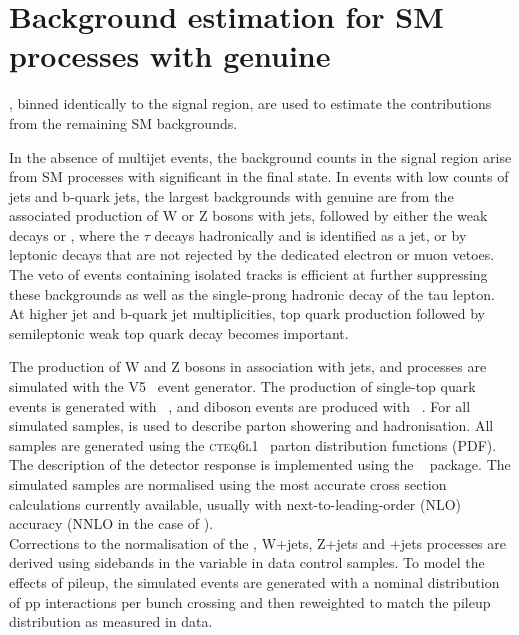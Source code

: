 \section{Background estimation for SM processes with genuine \texorpdfstring{\ETmiss}{MET}}
\label{sec:ewk_background}

, binned identically to the signal region, are used to estimate the
contributions from the remaining SM backgrounds.

In the absence of multijet events, the background counts in the signal
region arise from SM processes with significant \ETmiss in the final
state. In events with low counts of jets and b-quark jets, the largest
backgrounds with genuine \ETmiss are from the associated production of
W or Z bosons with jets, followed by either the weak decays \znunu or
\wtaunu, where the $\tau$ decays hadronically and is identified as a
jet, or by leptonic decays that are not rejected by the dedicated
electron or muon vetoes. The veto of events containing isolated tracks
is efficient at further suppressing these backgrounds as well as the
single-prong hadronic decay of the tau lepton. At higher jet and
b-quark jet multiplicities, top quark production followed by
semileptonic weak top quark decay becomes important.

The production of W and Z bosons in association with jets, \ttbar and
\gj processes are simulated with the \MADGRAPH V5~\cite{madgraph}
event generator. The production of single-top quark events is
generated with \POWHEG~\cite{powheg}, and diboson events are produced
with ~\cite{pythia8}. For all simulated samples, 
is used to describe parton showering and hadronisation. All samples
are generated using the \textsc{cteq6l1}~\cite{Pumplin:2002vw} parton
distribution functions (PDF). The description of the detector response
is implemented using the \GEANTfour~\cite{geant} package. The
simulated samples are normalised using the most accurate cross section
calculations currently available, usually with
next-to-leading-order (NLO) accuracy (NNLO in the case of \ttbar). \\
Corrections to the normalisation of the \gj, W+jets, Z+jets and \ttbar+jets 
processes are derived using sidebands in the \mht variable in data control samples. 
To model the effects of pileup, the simulated events are generated with a nominal distribution
of pp interactions per bunch crossing and then reweighted to match the
pileup distribution as measured in data.

